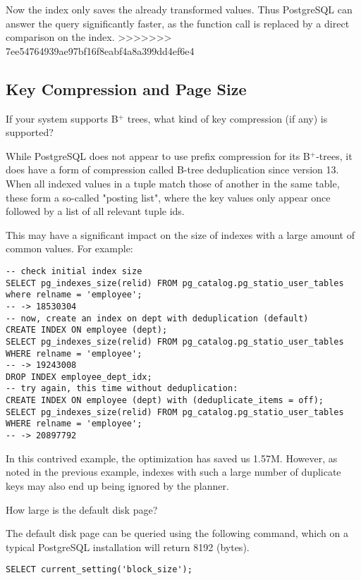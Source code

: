 \documentclass[11pt]{scrartcl}
\begin{document}
Now the index only saves the already transformed values. Thus PostgreSQL can answer the query significantly faster, as the function call is replaced by a direct comparison on the index.
>>>>>>> 7ee54764939ae97bf16f8eabf4a8a399dd4ef6e4

\subsection{Key Compression and Page Size}

If your system supports B$^+$ trees, what kind of key compression (if any) is supported?

While PostgreSQL does not appear to use prefix compression for its B$^+$-trees, it does have a form of compression called B-tree deduplication since version 13.  When all indexed values in a tuple match those of another in the same table, these form a so-called "posting list", where the key values only appear once followed by a list of all relevant tuple ids.

This may have a significant impact on the size of indexes with a large amount of common values.  For example:

\begin{lstlisting}[style=dbtsql]
-- check initial index size
SELECT pg_indexes_size(relid) FROM pg_catalog.pg_statio_user_tables where relname = 'employee';
-- -> 18530304
-- now, create an index on dept with deduplication (default)
CREATE INDEX ON employee (dept);
SELECT pg_indexes_size(relid) FROM pg_catalog.pg_statio_user_tables WHERE relname = 'employee';
-- -> 19243008
DROP INDEX employee_dept_idx;
-- try again, this time without deduplication:
CREATE INDEX ON employee (dept) with (deduplicate_items = off);
SELECT pg_indexes_size(relid) FROM pg_catalog.pg_statio_user_tables WHERE relname = 'employee';
-- -> 20897792
\end{lstlisting}

In this contrived example, the optimization has saved us 1.57M.  However, as noted in the previous example, indexes with such a large number of duplicate keys may also end up being ignored by the planner.

How large is the default disk page?

The default disk page can be queried using the following command, which on a typical PostgreSQL installation will return 8192 (bytes).

\begin{lstlisting}[style=dbtsql]
SELECT current_setting('block_size');
\end{lstlisting}
\end{document}
